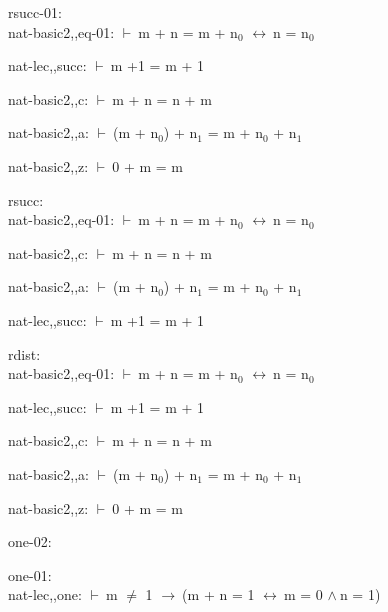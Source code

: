 \documentclass[a4paper]{article}
\newcommand{\Fol}{\mbox{$\vdash\ $}}
\newcommand{\And}{\mbox{$\wedge\ $}}
\newcommand{\Imp}{\mbox{$\rightarrow\ $}}
\newcommand{\Equiv}{\mbox{$\leftrightarrow\ $}}
\begin{document}
\bigskip

rsucc-01:\\ nat-basic2,,eq-01: 
 \Fol m + n = m + $\mbox{n}_{0}$ \Equiv n = $\mbox{n}_{0}$



nat-lec,,succ: 
 \Fol m +1 = m + 1



nat-basic2,,c: 
 \Fol m + n = n + m



nat-basic2,,a: 
 \Fol (m + $\mbox{n}_{0}$) + $\mbox{n}_{1}$ = m + $\mbox{n}_{0}$ + $\mbox{n}_{1}$



nat-basic2,,z: 
 \Fol 0 + m = m



\bigskip

rsucc:\\ nat-basic2,,eq-01: 
 \Fol m + n = m + $\mbox{n}_{0}$ \Equiv n = $\mbox{n}_{0}$



nat-basic2,,c: 
 \Fol m + n = n + m



nat-basic2,,a: 
 \Fol (m + $\mbox{n}_{0}$) + $\mbox{n}_{1}$ = m + $\mbox{n}_{0}$ + $\mbox{n}_{1}$



nat-lec,,succ: 
 \Fol m +1 = m + 1



\bigskip

rdist:\\ nat-basic2,,eq-01: 
 \Fol m + n = m + $\mbox{n}_{0}$ \Equiv n = $\mbox{n}_{0}$



nat-lec,,succ: 
 \Fol m +1 = m + 1



nat-basic2,,c: 
 \Fol m + n = n + m



nat-basic2,,a: 
 \Fol (m + $\mbox{n}_{0}$) + $\mbox{n}_{1}$ = m + $\mbox{n}_{0}$ + $\mbox{n}_{1}$



nat-basic2,,z: 
 \Fol 0 + m = m



\bigskip

one-02:\\ 

\bigskip

one-01:\\ nat-lec,,one: 
 \Fol m $\neq$ 1 \Imp (m + n = 1 \Equiv m = 0 \And n = 1)
\end{document}
